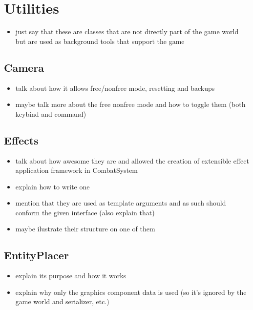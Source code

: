 \section{Utilities}

\begin{itemize}
    \item just say that these are classes that are not directly part of
        the game world but are used as background tools that support the game
\end{itemize}

\subsection{Camera}

\begin{itemize}
    \item talk about how it allows free/nonfree mode, resetting
        and backups
    \item maybe talk more about the free nonfree mode and how to toggle them
        (both keybind and command)
\end{itemize}

\subsection{Effects}

\begin{itemize}
    \item talk about how awesome they are and allowed the creation of
        extensible effect application framework in CombatSystem
    \item explain how to write one
    \item mention that they are used as template arguments and as such
        should conform the given interface (also explain that)
    \item maybe ilustrate their structure on one of them
\end{itemize}

\subsection{EntityPlacer}

\begin{itemize}
    \item explain its purpose and how it works
    \item explain why only the graphics component data is used (so it's ignored
        by the game world and serializer, etc.)
\end{itemize}

